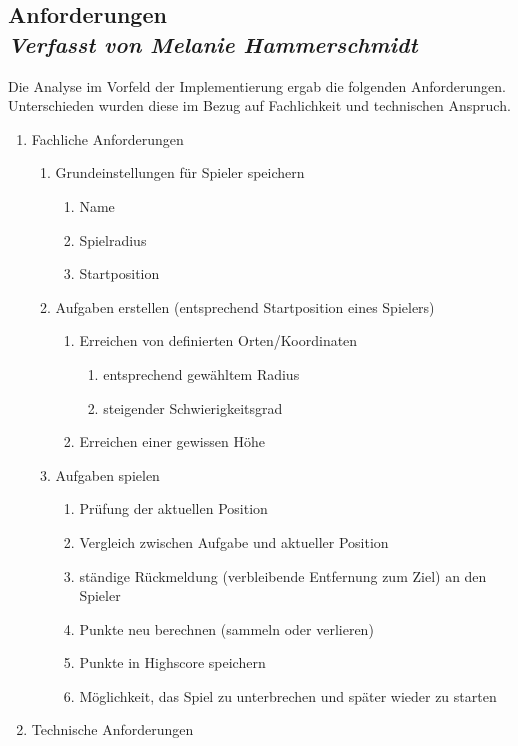 \subsection[Anforderungen]{Anforderungen
 \\ \textnormal{\small{\textit {Verfasst von Melanie Hammerschmidt}}}}

Die Analyse im Vorfeld der Implementierung ergab die folgenden Anforderungen. Unterschieden wurden diese im Bezug auf Fachlichkeit und technischen Anspruch.
\begin{enumerate}
\item Fachliche Anforderungen
	\begin{enumerate}
		\item Grundeinstellungen für Spieler speichern
		\begin{enumerate}
			\item Name
			\item Spielradius		
			\item Startposition
		\end{enumerate}
		\item Aufgaben erstellen (entsprechend Startposition eines Spielers)
		\begin{enumerate}
			\item Erreichen von definierten Orten/Koordinaten
			\begin{enumerate}
				\item entsprechend gewähltem Radius
				\item steigender Schwierigkeitsgrad
			\end{enumerate}
			\item Erreichen einer gewissen Höhe
		\end{enumerate}
		\item Aufgaben spielen
		\begin{enumerate}
			\item Prüfung der aktuellen Position 
			\item Vergleich zwischen Aufgabe und aktueller Position
			\item ständige Rückmeldung (verbleibende Entfernung zum Ziel) an den Spieler
			\item Punkte neu berechnen (sammeln oder verlieren)
			\item Punkte in Highscore speichern
			\item Möglichkeit, das Spiel zu unterbrechen und später wieder zu starten
		\end{enumerate}
	\end{enumerate}
	\item Technische Anforderungen

\end{enumerate}
